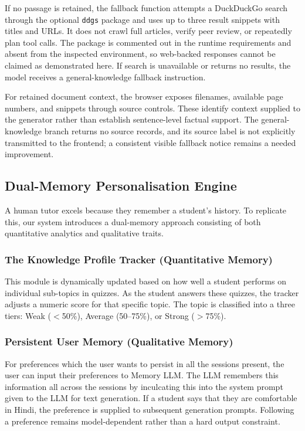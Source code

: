 \documentclass[11pt, a4paper, oneside]{report}
\begin{document}
If no passage is retained, the fallback function attempts a DuckDuckGo search through the optional \texttt{ddgs} package and uses up to three result snippets with titles and URLs. It does not crawl full articles, verify peer review, or repeatedly plan tool calls. The package is commented out in the runtime requirements and absent from the inspected environment, so web-backed responses cannot be claimed as demonstrated here. If search is unavailable or returns no results, the model receives a general-knowledge fallback instruction.

For retained document context, the browser exposes filenames, available page numbers, and snippets through source controls. These identify context supplied to the generator rather than establish sentence-level factual support. The general-knowledge branch returns no source records, and its source label is not explicitly transmitted to the frontend; a consistent visible fallback notice remains a needed improvement.

\subsection{Dual-Memory Personalisation Engine}

A human tutor excels because they remember a student's history. To replicate this, our
system introduces a dual-memory approach consisting of both quantitative analytics and
qualitative traits.

\subsubsection{The Knowledge Profile Tracker (Quantitative Memory)}
This module is dynamically updated based on how well a student performs on individual
sub-topics in quizzes. As the student answers these quizzes, the tracker adjusts a numeric
score for that specific topic. The topic is classified into a three tiers: Weak ($<$50\%),
Average (50--75\%), or Strong ($>$75\%).

\subsubsection{Persistent User Memory (Qualitative Memory)}
For preferences which the user wants to persist in all the sessions present, the user can
input their preferences to Memory LLM. The LLM remembers this information all across the
sessions by inculcating this into the system prompt given to the LLM for text generation.
If a student says that they are comfortable in Hindi, the preference is supplied to subsequent generation prompts. Following a preference remains model-dependent rather than a hard output constraint.
\end{document}
